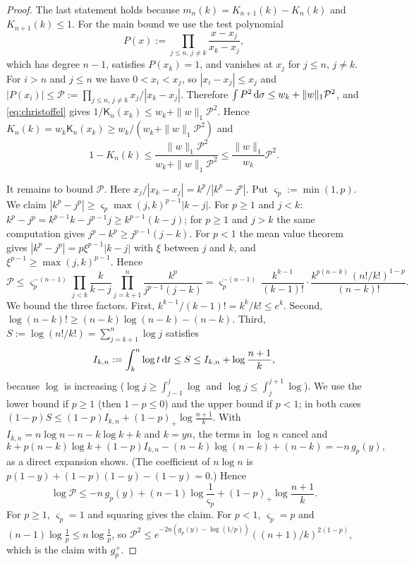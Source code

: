 \begin{proof}
The last statement holds because $m_n(k)=K_{n+1}(k)-K_n(k)$ and $K_{n+1}(k)\le1$. For the main bound we use the test
polynomial
\[
  P(x):=\prod_{j\le n,\,j\ne k}\frac{x-x_j}{x_k-x_j},
\]
which has degree $n-1$, satisfies $P(x_k)=1$, and vanishes at $x_j$ for $j\le n$, $j\ne k$. For $i>n$ and $j\le n$ we have
$0<x_i<x_j$, so $|x_i-x_j|\le x_j$ and $|P(x_i)|\le\mathcal P:=\prod_{j\le n,\,j\ne k}x_j/|x_k-x_j|$. Therefore
$\int P^2\,\mathrm{d}\sigma\le w_k+\|w\|_1\mathcal P^2$, and \eqref{eq:christoffel} gives $1/\mathsf K_n(x_k)\le w_k+\|w\|_1\mathcal P^2$. Hence
$K_n(k)=w_k\mathsf K_n(x_k)\ge w_k/(w_k+\|w\|_1\mathcal P^2)$ and
\[
  1-K_n(k)\le\frac{\|w\|_1\mathcal P^2}{w_k+\|w\|_1\mathcal P^2}\le\frac{\|w\|_1}{w_k}\mathcal P^2 .
\]

It remains to bound $\mathcal P$. Here $x_j/|x_k-x_j|=k^p/|k^p-j^p|$. Put $\varsigma_p:=\min(1,p)$. We claim
$|k^p-j^p|\ge \varsigma_p\max(j,k)^{p-1}|k-j|$. For $p\ge1$ and $j<k$: $k^p-j^p=k^{p-1}k-j^{p-1}j\ge k^{p-1}(k-j)$; for $p\ge1$
and $j>k$ the same computation gives $j^p-k^p\ge j^{p-1}(j-k)$. For $p<1$ the mean value theorem gives
$|k^p-j^p|=p\xi^{p-1}|k-j|$ with $\xi$ between $j$ and $k$, and $\xi^{p-1}\ge\max(j,k)^{p-1}$. Hence
\[
  \mathcal P\le \varsigma_p^{-(n-1)}\prod_{j<k}\frac k{k-j}\prod_{j=k+1}^n\frac{k^p}{j^{p-1}(j-k)}
  =\varsigma_p^{-(n-1)}\,\frac{k^{k-1}}{(k-1)!}\cdot\frac{k^{p(n-k)}\,(n!/k!)^{1-p}}{(n-k)!} .
\]
We bound the three factors. First, $k^{k-1}/(k-1)!=k^k/k!\le e^k$. Second, $\log(n-k)!\ge(n-k)\log(n-k)-(n-k)$.
Third, $S:=\log(n!/k!)=\sum_{j=k+1}^n\log j$ satisfies
\[
  I_{k,n}:=\int_k^n\log t\,\mathrm{d} t\le S\le I_{k,n}+\log\frac{n+1}k,
\]
because $\log$ is increasing ($\log j\ge\int_{j-1}^j\log$ and $\log j\le\int_j^{j+1}\log$). We use the lower bound if
$p\ge1$ (then $1-p\le0$) and the upper bound if $p<1$; in both cases $(1-p)S\le(1-p)I_{k,n}+(1-p)_+\log\frac{n+1}k$.
With $I_{k,n}=n\log n-n-k\log k+k$ and $k=yn$, the terms in $\log n$ cancel and
\[
  k+p(n-k)\log k+(1-p)I_{k,n}-(n-k)\log(n-k)+(n-k)=-n\,g_p(y),
\]
as a direct expansion shows. (The coefficient of $n\log n$ is $p(1-y)+(1-p)(1-y)-(1-y)=0$.) Hence
\[
  \log\mathcal P\le-n\,g_p(y)+(n-1)\log\frac1{\varsigma_p}+(1-p)_+\log\frac{n+1}k .
\]
For $p\ge1$, $\varsigma_p=1$ and squaring gives the claim. For $p<1$, $\varsigma_p=p$ and $(n-1)\log\frac1p\le n\log\frac1p$, so
$\mathcal P^2\le e^{-2n(g_p(y)-\log(1/p))}((n+1)/k)^{2(1-p)}$, which is the claim with $g_p^+$.
\end{proof}

